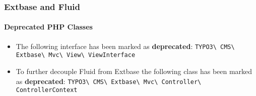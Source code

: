 %

\begin{frame}[fragile]
	\frametitle{Extbase and Fluid}
	\framesubtitle{Deprecated PHP Classes}


	\begin{itemize}
		\item The following interface has been marked as \textbf{deprecated}:\newline
			\small\texttt{TYPO3\textbackslash
				CMS\textbackslash
				Extbase\textbackslash
				Mvc\textbackslash
				View\textbackslash
				ViewInterface}\normalsize
		\item To further decouple Fluid from Extbase the following class has
			been marked as \textbf{deprecated}:\newline
			\small\texttt{TYPO3\textbackslash
				CMS\textbackslash
				Extbase\textbackslash
				Mvc\textbackslash
				Controller\textbackslash
				ControllerContext}\normalsize
	\end{itemize}

\end{frame}


